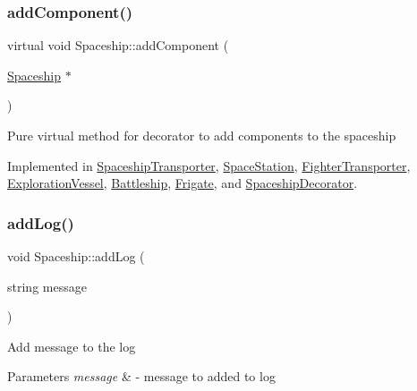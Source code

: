\subsubsection{\texorpdfstring{add\+Component()}{addComponent()}}
{\footnotesize\ttfamily virtual void Spaceship\+::add\+Component (\begin{DoxyParamCaption}\item[{\hyperlink{classSpaceship}{Spaceship} $\ast$}]{ }\end{DoxyParamCaption})\hspace{0.3cm}{\ttfamily [pure virtual]}}

Pure virtual method for decorator to add components to the spaceship 

Implemented in \hyperlink{classSpaceshipTransporter_acd55c6864eab86db5e0485beeec4e8b9}{Spaceship\+Transporter}, \hyperlink{classSpaceStation_ae89449fdcf5d44229fb93a14fc496fe1}{Space\+Station}, \hyperlink{classFighterTransporter_a962db4e241d764360407380ce1438788}{Fighter\+Transporter}, \hyperlink{classExplorationVessel_ae952e198a28fd0a5ec998ecdcca86561}{Exploration\+Vessel}, \hyperlink{classBattleship_a698e2d0ef1ffa4e6b5e7b09c0ff7d07c}{Battleship}, \hyperlink{classFrigate_af1c809e79096219e53da2f577ec8178d}{Frigate}, and \hyperlink{classSpaceshipDecorator_a08442441af1fa8979f1e411a5e7b511c}{Spaceship\+Decorator}.

\mbox{\label{classSpaceship_acf25a335848231435a64a484c103dfcb}} 
\subsubsection{\texorpdfstring{add\+Log()}{addLog()}}
{\footnotesize\ttfamily void Spaceship\+::add\+Log (\begin{DoxyParamCaption}\item[{string}]{message }\end{DoxyParamCaption})}

Add message to the log 
\begin{DoxyParams}{Parameters}
{\em message} & -\/ message to added to log \\
\hline
\end{DoxyParams}
\mbox{\label{classSpaceship_a67b7e60d2dc77e740309a9d994d653a1}} 

